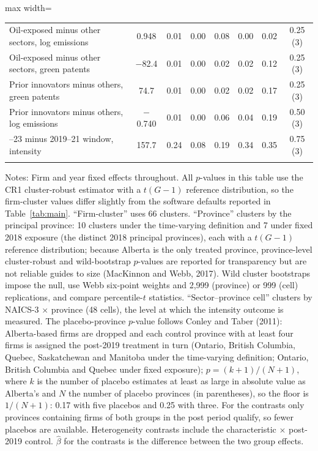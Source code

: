 \begin{table}[htbp]
\begin{adjustbox}{max width=\textwidth}
\begin{tabular}{lccccccc}
\quad Oil-exposed minus other sectors, log emissions & 0.948 & 0.01 & 0.00 & 0.08 & 0.00 & 0.02 & 0.25 (3) \\
\quad Oil-exposed minus other sectors, green patents & $-$82.4 & 0.01 & 0.00 & 0.02 & 0.02 & 0.12 & 0.25 (3) \\
\quad Prior innovators minus others, green patents & 74.7 & 0.01 & 0.00 & 0.02 & 0.02 & 0.17 & 0.25 (3) \\
\quad Prior innovators minus others, log emissions & $-$0.740 & 0.01 & 0.00 & 0.06 & 0.04 & 0.19 & 0.50 (3) \\
\quad 2022--23 minus 2019--21 window, intensity & 157.7 & 0.24 & 0.08 & 0.19 & 0.34 & 0.35 & 0.75 (3) \\
\addlinespace
\bottomrule
\end{tabular}
\end{adjustbox}
\par\vspace{3pt}\begin{minipage}{\textwidth}\footnotesize
Notes: Firm and year fixed effects throughout. All $p$-values in this table use the CR1 cluster-robust estimator with a $t(G-1)$ reference distribution, so the firm-cluster values differ slightly from the software defaults reported in Table~\ref{tab:main}. ``Firm-cluster'' uses 66 clusters. ``Province'' clusters by the principal province: 10 clusters under the time-varying definition and 7 under fixed 2018 exposure (the distinct 2018 principal provinces), each with a $t(G-1)$ reference distribution; because Alberta is the only treated province, province-level cluster-robust and wild-bootstrap $p$-values are reported for transparency but are not reliable guides to size (MacKinnon and Webb, 2017). Wild cluster bootstraps impose the null, use Webb six-point weights and 2,999 (province) or 999 (cell) replications, and compare percentile-$t$ statistics. ``Sector--province cell'' clusters by NAICS-3 $\times$ province (48 cells), the level at which the intensity outcome is measured. The placebo-province $p$-value follows Conley and Taber (2011): Alberta-based firms are dropped and each control province with at least four firms is assigned the post-2019 treatment in turn (Ontario, British Columbia, Quebec, Saskatchewan and Manitoba under the time-varying definition; Ontario, British Columbia and Quebec under fixed exposure); $p = (k+1)/(N+1)$, where $k$ is the number of placebo estimates at least as large in absolute value as Alberta's and $N$ the number of placebo provinces (in parentheses), so the floor is $1/(N+1)$: 0.17 with five placebos and 0.25 with three. For the contrasts only provinces containing firms of both groups in the post period qualify, so fewer placebos are available. Heterogeneity contrasts include the characteristic $\times$ post-2019 control. $\hat\beta$ for the contrasts is the difference between the two group effects.
\end{minipage}
\end{table}
